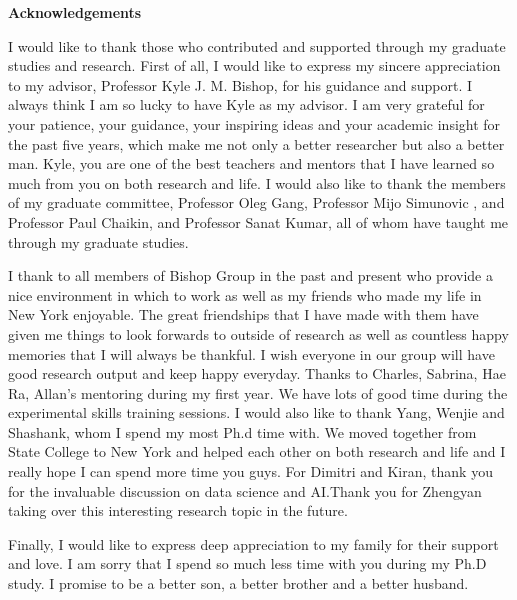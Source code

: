 
\clearpage
\begin{center}

\vspace*{5\baselineskip}
\textbf{\large Acknowledgements}
\end{center}

\hspace{10mm}I would like to thank those who contributed and supported through my graduate studies and research. First of all, I would like to express my sincere appreciation to
my advisor, Professor Kyle J. M. Bishop, for his guidance and support. I always think I am so lucky to have Kyle as my advisor. I am very grateful for your  patience, your guidance, your inspiring ideas and your academic insight  for the past five years, which make me not only a better researcher but also a better man. Kyle, you are one of the best teachers and mentors that I have learned so much from you on both research and life. I would also like to thank the members of my graduate
committee, Professor Oleg Gang, Professor Mijo Simunovic , and Professor Paul Chaikin, and Professor Sanat Kumar, all of whom have taught me through my graduate studies.

I thank to  all members of Bishop Group in the past and present who provide a nice environment in which to work as well as my friends who made my life in New York enjoyable. The
great friendships that I have made with them have given me things to look forwards to outside of
research as well as countless happy memories that I will always be thankful. I wish everyone in our group will have good research output and keep happy everyday. Thanks to Charles, Sabrina, Hae Ra,  Allan's mentoring during my first year. We have lots of good time during the experimental skills training sessions. I would also like to thank Yang, Wenjie and Shashank, whom I spend my most Ph.d time with. We moved together from State College to New York and helped each other on both research and life and I really hope I can spend more time you guys.  For Dimitri and Kiran, thank you for the invaluable discussion on data science and AI.Thank you for Zhengyan taking over this interesting research topic in the future.

Finally, I would like to express deep appreciation to my family for their support and love. I am sorry that I spend so much less time with you during my Ph.D study. I promise to be a better son, a better brother and a better husband. 
\clearpage

 


